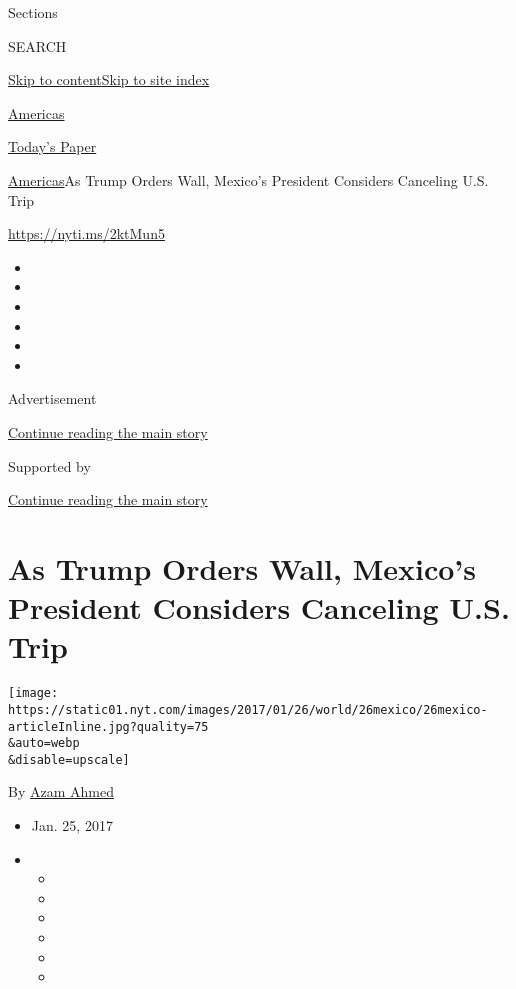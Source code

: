 Sections

SEARCH

\protect\hyperlink{site-content}{Skip to
content}\protect\hyperlink{site-index}{Skip to site index}

\href{https://www.nytimes.com/section/world/americas}{Americas}

\href{https://myaccount.nytimes.com/auth/login?response_type=cookie\&client_id=vi}{}

\href{https://www.nytimes.com/section/todayspaper}{Today's Paper}

\href{/section/world/americas}{Americas}\textbar{}As Trump Orders Wall,
Mexico's President Considers Canceling U.S. Trip

\url{https://nyti.ms/2ktMun5}

\begin{itemize}
\item
\item
\item
\item
\item
\item
\end{itemize}

Advertisement

\protect\hyperlink{after-top}{Continue reading the main story}

Supported by

\protect\hyperlink{after-sponsor}{Continue reading the main story}

\hypertarget{as-trump-orders-wall-mexicos-president-considers-canceling-us-trip}{%
\section{As Trump Orders Wall, Mexico's President Considers Canceling
U.S.
Trip}\label{as-trump-orders-wall-mexicos-president-considers-canceling-us-trip}}

\texttt{[image: https://static01.nyt.com/images/2017/01/26/world/26mexico/26mexico-articleInline.jpg?quality=75\\\&auto=webp\\\&disable=upscale]}

By \href{http://www.nytimes.com/by/azam-ahmed}{Azam Ahmed}

\begin{itemize}
\item
  Jan. 25, 2017
\item
  \begin{itemize}
  \item
  \item
  \item
  \item
  \item
  \item
  \end{itemize}
\end{itemize}

